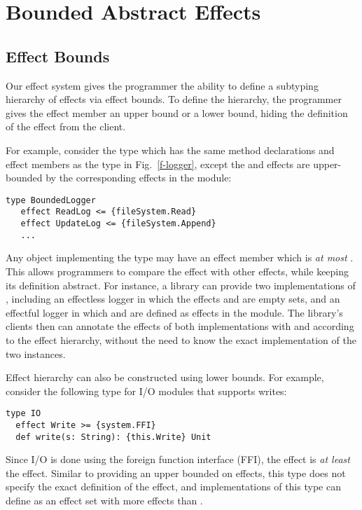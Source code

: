 
\chapter{Bounded Abstract Effects}
\label{chapter-bound}

\section{Effect Bounds}
\label{sec-bound}

Our effect system  gives the programmer the ability to define a subtyping hierarchy of effects via effect bounds. To define the hierarchy, the programmer gives the effect member an upper bound or a lower bound, hiding the definition of the effect from the client.

For example, consider the type  which has the same method declarations and effect members as the type  in Fig.~\ref{f-logger}, except the  and  effects are upper-bounded by the corresponding effects in the  module:

\begin{minipage}{\linewidth}
\begin{lstlisting}[xleftmargin=-5pt, numbers=none]
type BoundedLogger
   effect ReadLog <= {fileSystem.Read}
   effect UpdateLog <= {fileSystem.Append}
   ...
\end{lstlisting}
\end{minipage}
Any object implementing the type  may have an effect member  which is \textit{at most} . This allows programmers to compare the  effect with other effects, while keeping its definition abstract. For instance, a library can provide two implementations of , including an effectless logger in which the effects  and  are empty sets, and an effectful logger in which  and  are defined as effects in the  module. The library's clients then can annotate the effects of both implementations with  and  according to the effect hierarchy, without the need to know the exact implementation of the two instances.

Effect hierarchy can also be constructed using lower bounds. For example, consider the following type for I/O modules that supports writes:

\begin{minipage}{\linewidth}
\begin{lstlisting}[xleftmargin=-5pt, numbers=none]
type IO
  effect Write >= {system.FFI}
  def write(s: String): {this.Write} Unit
\end{lstlisting}
\end{minipage}
Since I/O is done using the foreign function interface (FFI), the  effect is \textit{at least} the  effect. Similar to providing an upper bounded on effects, this type does not specify the exact definition of the  effect, and implementations of this type can define  as an effect set with more effects than .

